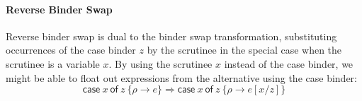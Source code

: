 \documentclass[acmsmall,review,screen]{acmart}
\newcommand{\ccase}[2]{\mathsf{case}~#1~\mathsf{of}~#2}
\begin{document}
% 

\paragraph{Reverse Binder Swap\label{sec:reverse-binder-swap-considered-harmful}}

%

Reverse binder swap is dual to the binder swap transformation, substituting
occurrences of the case binder $z$ by the scrutinee in the special case when
the scrutinee is a variable $x$.
%
By using the scrutinee $x$ instead of the case binder, we might be able to
float out expressions from the alternative using the case binder:
\[
    \ccase{x}{z~\{\rho \rightarrow e\}} \Rightarrow \ccase{x}{z~\{\rho \rightarrow e[x/z]\}}
\]
\end{document}
